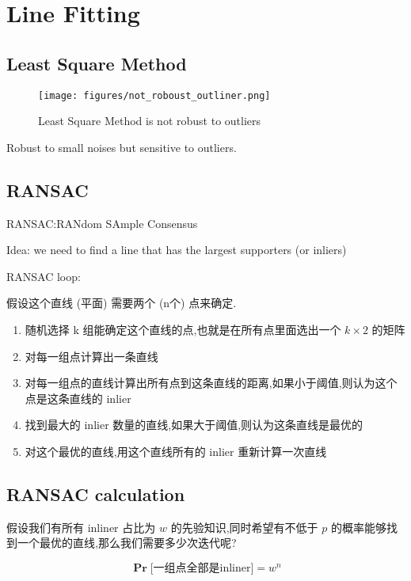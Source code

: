 \section{Line Fitting}

\subsection{Least Square Method}

\begin{figure}[htbp]
    \centering
    \texttt{[image: figures/not\_roboust\_outliner.png]}
    \caption{Least Square Method is not robust to outliers}
\end{figure}

Robust to small noises but sensitive to outliers.

\subsection{RANSAC}

RANSAC:RANdom SAmple Consensus

Idea: we need to ﬁnd a line that has the largest supporters (or inliers)

RANSAC loop:

假设这个直线 (平面) 需要两个 (n个) 点来确定.

\begin{enumerate}
    \item 随机选择 k 组能确定这个直线的点,也就是在所有点里面选出一个 $k\times 2$ 的矩阵
    \item 对每一组点计算出一条直线
    \item 对每一组点的直线计算出所有点到这条直线的距离,如果小于阈值,则认为这个点是这条直线的 inlier
    \item 找到最大的 inlier 数量的直线,如果大于阈值,则认为这条直线是最优的
    \item 对这个最优的直线,用这个直线所有的 inlier 重新计算一次直线
\end{enumerate}

\subsection{RANSAC calculation}

假设我们有所有 inliner 占比为 $w$ 的先验知识,同时希望有不低于 $p$ 的概率能够找到一个最优的直线,那么我们需要多少次迭代呢?

\begin{equation}
\mathbf{\Pr}\text{[一组点全部是inliner]} = w^n
\end{equation}


